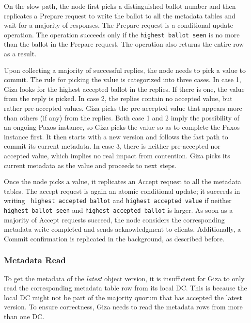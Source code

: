 On the slow path, the {\name} node first picks a distinguished ballot number
and then replicates a Prepare request to write the ballot to all the metadata
tables and wait for a majority of responses.
The Prepare request is a conditional update operation.
The operation succeeds only if the {\tt highest ballot seen} is no more than 
the ballot in the Prepare request.
The operation also returns the entire row as a result.

Upon collecting a majority of successful replies, the {\name} node needs to pick a value to commit.
The rule for picking the value is categorized into three cases.
In case 1, Giza looks for the highest accepted ballot in the replies.
If there is one, the value from the reply is picked.
In case 2, the replies contain no accepted value, but rather pre-accepted values.
Giza picks the pre-accepted value that appears more than others (if any) from the replies.
Both case 1 and 2 imply the possibility of an ongoing Paxos instance,
so Giza picks the value so as to complete the Paxos instance first.
It then starts with a new version and follows the fast path to commit its current metadata.
In case 3, there is neither pre-accepted nor accepted value,
which implies no real impact from contention.
Giza picks its current metadata as the value and proceeds to next steps.

Once the {\name} node picks a value, it replicates an Accept request to all the metadata tables.
The accept request is again an atomic conditional update; it succeeds in writing {\tt
highest accepted ballot} and {\tt highest accepted value} if neither {\tt
highest ballot seen} and {\tt highest accepted ballot} is larger.
As soon as a majority of Accept requests succeed, the \name node considers the
corresponding metadata write completed and sends acknowledgment to clients.
Additionally, a Commit confirmation is replicated in the background, as described before.

\subsubsection{Metadata Read}

To get the metadata of the \emph{latest} object version,
it is insufficient for Giza to only read the corresponding metadata table row from its local DC.
This is because the local DC might not be part of the majority quorum that has accepted the latest version.
To ensure correctness, Giza needs to read the metadata rows from more than one DC.

